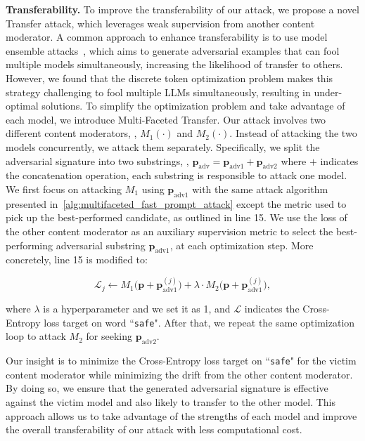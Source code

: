 



\noindent\textbf{Transferability.} To improve the transferability of our attack, we propose a novel Transfer attack, which leverages weak supervision from another content moderator. A common approach to enhance transferability is to use model ensemble attacks~\cite{chen2023adaptive},
which aims to generate adversarial examples that can fool multiple models simultaneously, increasing the likelihood of transfer to others.
However, we found that the discrete token optimization problem makes this strategy challenging to fool multiple LLMs simultaneously, resulting in under-optimal solutions. To simplify the optimization problem and take advantage of each model, we introduce Multi-Faceted Transfer. Our attack involves two different content moderators, \ie, $M_1(\cdot)$ and $M_2(\cdot)$.  Instead of attacking the two models concurrently, we attack them separately. Specifically, we split the adversarial signature into two substrings, \ie, $\mathbf{p}_{\text{adv}} = \mathbf{p}_{\text{adv1}} + \mathbf{p}_{\text{adv2}}$ where $+$ indicates the concatenation operation, each substring is responsible to attack one model. We first focus on attacking $M_1$ using $\mathbf{p}_{\text{adv1}}$ with the same attack algorithm presented in~\cref{alg:multifaceted_fast_prompt_attack} except the metric used to pick up the best-performed candidate, as outlined in line 15. We use the loss of the other content moderator as an auxiliary supervision metric to select the best-performing adversarial substring $\mathbf{p}_{\text{adv1}}$, at each optimization step. More concretely, line 15 is modified to:

\vspace{-15pt}
{\small 
\begin{equation}
    \mathcal{L}_j \leftarrow M_1\big(\mathbf{p}+\mathbf{p}_{\text{adv1}}^{(j)}\big) + \lambda \cdot  M_2\big(\mathbf{p}+\mathbf{p}_{\text{adv1}}^{(j)}\big),
\end{equation}
}\vspace{-15pt}

where $\lambda$ is a hyperparameter and we set it as 1, and $\mathcal{L}$ indicates the Cross-Entropy loss target on word ``\texttt{safe}". After that, we repeat the same optimization loop to attack $M_2$ for seeking $\mathbf{p}_{\text{adv2}}$. 

Our insight is to minimize the Cross-Entropy loss target on ``\texttt{safe}" for the victim content moderator while minimizing the drift from the other content moderator. By doing so, we ensure that the generated adversarial signature is effective against the victim model and also likely to transfer to the other model. This approach allows us to take advantage of the strengths of each model and improve the overall transferability of our attack with less computational cost.
